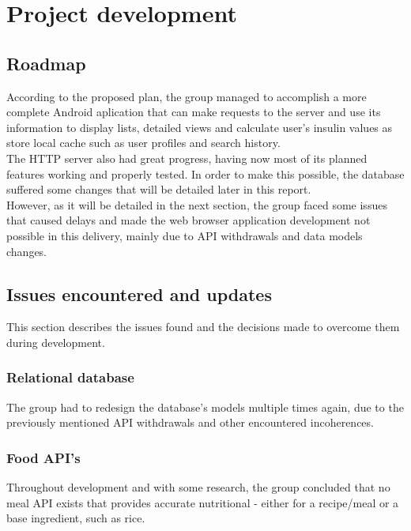 %
%
\chapter{Project development}
    
	\section{Roadmap}

    According to the proposed plan, the group managed to accomplish a more complete Android aplication 
    that can make requests to the server and use its information to display lists,
    detailed views and calculate user's insulin values as store local cache such as 
    user profiles and search history.\\

    The HTTP server also had great progress, having now most of its planned features working and properly tested. In order
    to make this possible, the database suffered some changes that will be detailed later in this report.\\

    However, as it will be detailed in the next section, the group faced some issues that caused
    delays and made the web browser application development not possible in this delivery, mainly due to API
    withdrawals and data models changes.\\

    \section{Issues encountered and updates}

    This section describes the issues found and the decisions made
    to overcome them during development.
    
    \subsection{Relational database}

    The group had to redesign the database's models multiple times again, due to the previously mentioned API withdrawals and other encountered
    incoherences.\\    

    \subsection{Food API's}
    Throughout development and with some research, the group concluded that no meal API exists
    that provides accurate nutritional - either for a recipe/meal or a base ingredient, such as rice.\\

